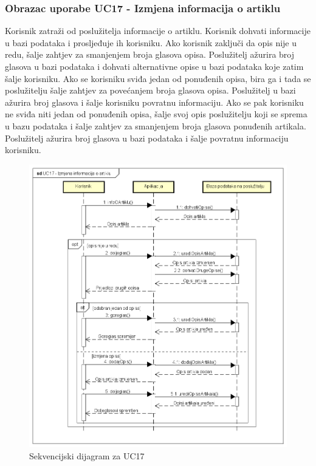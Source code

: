 				\subsubsection{Obrazac uporabe UC17 - Izmjena informacija o artiklu}
				    Korisnik zatraži od poslužitelja informacije o artiklu. Korisnik dohvati informacije u bazi podataka i prosljeđuje ih korisniku. Ako korisnik zaključi da opis nije u redu, šalje zahtjev za smanjenjem broja glasova opisa. Poslužitelj ažurira broj glasova u bazi podataka i dohvati alternativne opise u bazi podataka koje zatim šalje korisniku. Ako se korisniku sviđa jedan od ponuđenih opisa, bira ga i tada se poslužitelju šalje zahtjev za povećanjem broja glasova opisa. Poslužitelj u bazi ažurira broj glasova i šalje korisniku povratnu informaciju. Ako se pak korisniku ne sviđa niti jedan od ponuđenih opisa, šalje svoj opis poslužitelju koji se sprema u bazu podataka i šalje zahtjev za smanjenjem broja glasova ponuđenih artikala. Poslužitelj ažurira broj glasova u bazi podataka i šalje povratnu informaciju korisniku.
	    \begin{figure}[H]
		    \centering
			\includegraphics[width=1.0\linewidth]{dijagrami/sd_uc17.png}
			\caption{Sekvencijski dijagram za UC17}
			\label{fig:sd_uc17}
		\end{figure}
				\eject
	
